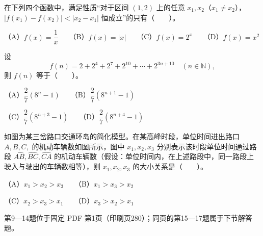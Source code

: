 \begin{question}
在下列四个函数中，满足性质“对于区间 $(1,2)$ 上的任意 $x_1,x_2$（$x_1\ne x_2$），$|f(x_1)-f(x_2)|<|x_2-x_1|$ 恒成立”的只有\mbox{（　　）}。

（A）$f(x)=\dfrac1x$　　（B）$f(x)=|x|$　　（C）$f(x)=2^x$　　（D）$f(x)=x^2$

\end{question}
\begin{question}
设
\nopagebreak[4]
\[
f(n)=2+2^4+2^7+2^{10}+\cdots+2^{3n+10}\quad(n\in\mathbb N),
\]
则 $f(n)$ 等于\mbox{（　　）}。

（A）$\dfrac27(8^n-1)$　　（B）$\dfrac27(8^{n+1}-1)$

（C）$\dfrac27(8^{n+3}-1)$　　（D）$\dfrac27(8^{n+4}-1)$

\Needspace{0.4\textheight}
\end{question}
\begin{question}
如图为某三岔路口交通环岛的简化模型。在某高峰时段，单位时间进出路口 $A,B,C,$ 的机动车辆数如图所示，图中 $x_1,x_2,x_3$ 分别表示该时段单位时间通过路段 $\widehat{AB},\widehat{BC},\widehat{CA}$ 的机动车辆数（假设：单位时间内，在上述路段中，同一路段上驶入与驶出的车辆数相等），则 $x_1,x_2,x_3$ 的大小关系是\mbox{（　　）}。
\nopagebreak[4]
\begin{center}\end{center}
\nopagebreak[4]
（A）$x_1>x_2>x_3$　　（B）$x_1>x_3>x_2$

（C）$x_2>x_3>x_1$　　（D）$x_3>x_2>x_1$

\end{question}

\begin{gktip}
第9—14题位于固定 PDF 第1页（印刷页280）；同页的第15—17题属于下节解答题。
\end{gktip}

